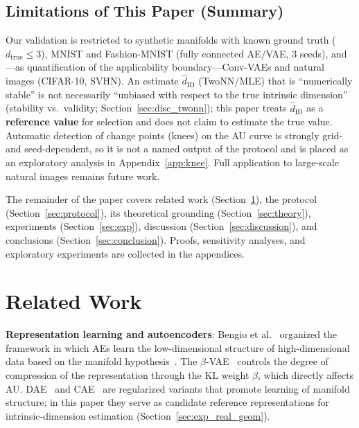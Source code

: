 \documentclass[make,article,submit,pdftex,moreauthors]{Definitions/mdpi}
\newcommand{\hatdID}{\hat{d}_{\mathrm{ID}}}
\newcommand{\dtrue}{d_{\mathrm{true}}}
\begin{document}
\subsection{Limitations of This Paper (Summary)}\label{sec:intro_limits}

Our validation is restricted to synthetic manifolds with known ground truth
($\dtrue \leq 3$), MNIST and Fashion-MNIST (fully connected AE/VAE,
3 seeds), and---as quantification of the applicability boundary---Conv-VAEs
and natural images (CIFAR-10, SVHN).
An estimate $\hatdID$ (TwoNN/MLE) that is ``numerically stable'' is not
necessarily ``unbiased with respect to the true intrinsic dimension''
(stability vs.\ validity; Section~\ref{sec:disc_twonn}); this paper treats
$\hatdID$ as a \textbf{reference value} for selection and does not claim to
estimate the true value.
Automatic detection of change points (knees) on the AU curve is strongly
grid- and seed-dependent, so it is not a named output of the protocol and is
placed as an exploratory analysis in Appendix~\ref{app:knee}.
Full application to large-scale natural images remains future work.

The remainder of the paper covers related work (Section~\ref{sec:related}),
the protocol (Section~\ref{sec:protocol}), its theoretical grounding
(Section~\ref{sec:theory}), experiments (Section~\ref{sec:exp}), discussion
(Section~\ref{sec:discussion}), and conclusions
(Section~\ref{sec:conclusion}).
Proofs, sensitivity analyses, and exploratory experiments are collected in
the appendices.

\section{Related Work}\label{sec:related}

\textbf{Representation learning and autoencoders}:
Bengio et al.~\cite{bengio2013representation} organized the framework in
which AEs learn the low-dimensional structure of high-dimensional data based
on the manifold hypothesis~\cite{fefferman2016manifold}.
The $\beta$-VAE~\cite{higgins2017betavae} controls the degree of compression
of the representation through the KL weight $\beta$, which directly affects
AU.
DAE~\cite{alain2014dae} and CAE~\cite{rifai2011cae} are regularized variants
that promote learning of manifold structure; in this paper they serve as
candidate reference representations for intrinsic-dimension estimation
(Section~\ref{sec:exp_real_geom}).
\end{document}
